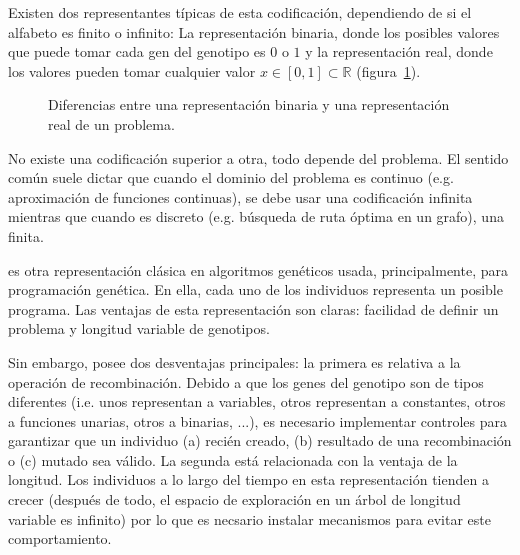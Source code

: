 Existen dos representantes típicas de esta codificación, dependiendo de si el alfabeto es finito o infinito: La representación binaria, donde los posibles valores que puede tomar cada gen del genotipo es $0$ o $1$ y la representación real, donde los valores pueden tomar cualquier valor $x \in [0, 1] \subset \mathbb{R}$ (figura~\ref{fig:bin-vs-real-ŕepresentation}).

\begin{figure}
	\caption{Diferencias entre una representación binaria y una representación real de un problema.}
	\label{fig:bin-vs-real-ŕepresentation}
\end{figure}

No existe una codificación superior a otra, todo depende del problema. El sentido común suele dictar que cuando el dominio del problema es continuo (e.g. aproximación de funciones continuas), se debe usar una codificación infinita mientras que cuando es discreto (e.g. búsqueda de ruta óptima en un grafo), una finita.

 es otra representación clásica en algoritmos genéticos usada, principalmente, para programación genética. En ella, cada uno de los individuos representa un posible programa. Las ventajas de esta representación son claras: facilidad de definir un problema y longitud variable de genotipos.

Sin embargo, posee dos desventajas principales: la primera es relativa a la operación de recombinación. Debido a que los genes del genotipo son de tipos diferentes (i.e. unos representan a variables, otros representan a constantes, otros a funciones unarias, otros a binarias, ...), es necesario implementar controles para garantizar que un individuo (a) recién creado, (b) resultado de una recombinación o (c) mutado sea válido. La segunda está relacionada con la ventaja de la longitud. Los individuos a lo largo del tiempo en esta representación tienden a crecer (después de todo, el espacio de exploración en un árbol de longitud variable es infinito) por lo que es necsario instalar mecanismos para evitar este comportamiento.

